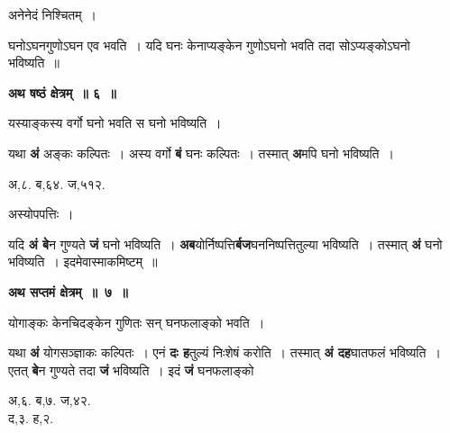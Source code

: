 \documentclass[11pt, openany]{book}
\begin{document}
 अनेनेदं निश्चितम्~।\\
\vspace{-1mm}
 
 घनोऽघनगुणोऽघन एव भवति~। यदि घनः केनाप्यङ्केन गुणोऽघनो भवति तदा सोऽप्यङ्कोऽघनो भविष्यति~॥ 

\newpage
\begin{center}
\textbf{\large अथ षष्ठं क्षेत्रम्~॥ ६~॥ }
\end{center}

{\ab यस्याङ्कस्य वर्गो घनो भवति स घनो भविष्यति~।} 

\begin{flushleft}
\begin{minipage}[t]{0.6\textwidth}
\hspace{4mm} यथा \textbf{अं} अङ्कः कल्पितः~। अस्य वर्गो \textbf{बं} घनः कल्पितः~। तस्मात् \textbf{अ}मपि घनो भविष्यति~।
\end{minipage} 
\hfill
\begin{minipage}[t]{0.3\textwidth}
अ,८. ब,६४. ज,५१२.
\end{minipage}
\end{flushleft}
\vspace{-3mm}

\begin{center}
अस्योपपत्तिः~।
\end{center}

यदि \textbf{अं बे}न गुण्यते \textbf{जं} घनो भविष्यति~। \textbf{अब}योर्निष्पत्ति\textbf{र्बज}घननिष्पत्तितुल्या भविष्यति~। तस्मात् \textbf{अं} घनो भविष्यति~। इदमेवास्माकमिष्टम्~॥ 
\vspace{2mm}

\begin{center}
\textbf{\large अथ सप्तमं क्षेत्रम्~॥~७~॥}
\end{center}

{\ab योगाङ्कः केनचिदङ्केन गुणितः सन् घनफलाङ्को भवति~।}

\begin{flushleft}
\begin{minipage}[t]{0.65\textwidth}
\hspace{4mm} यथा \textbf{अं} योगसञ्ज्ञाकः कल्पितः~। एनं \textbf{दः ह}तुल्यं निःशेषं करोति~। तस्मात् \textbf{अं दह}घातफलं भविष्यति~। एतत् \textbf{बे}न गुण्यते तदा \textbf{जं} भविष्यति~। इदं \textbf{जं} घनफलाङ्को
\end{minipage} 
\hfill
\begin{minipage}[t]{0.25\textwidth}
अ,६. ब,७. ज,४२. \\
द,३. ह,२.
\end{minipage}
\end{flushleft}
\vspace{-3mm}
\end{document}
